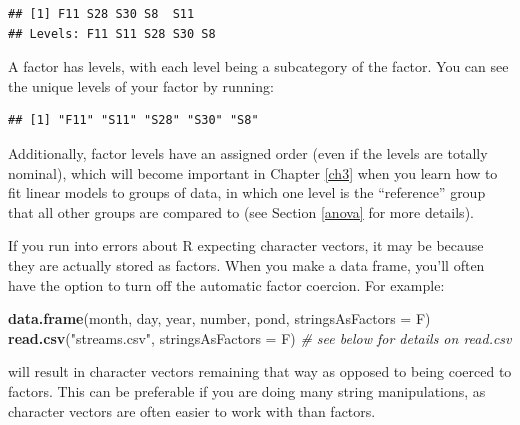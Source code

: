 \documentclass[]{book}
\newenvironment{Shaded}{\begin{snugshade}}{\end{snugshade}}
\newcommand{\KeywordTok}[1]{\textcolor[rgb]{0.13,0.29,0.53}{\textbf{#1}}}
\newcommand{\DataTypeTok}[1]{\textcolor[rgb]{0.13,0.29,0.53}{#1}}
\newcommand{\StringTok}[1]{\textcolor[rgb]{0.31,0.60,0.02}{#1}}
\newcommand{\CommentTok}[1]{\textcolor[rgb]{0.56,0.35,0.01}{\textit{#1}}}
\newcommand{\OperatorTok}[1]{\textcolor[rgb]{0.81,0.36,0.00}{\textbf{#1}}}
\newcommand{\NormalTok}[1]{#1}
\theoremstyle{definition}
\theoremstyle{definition}
\theoremstyle{definition}
\theoremstyle{remark}
\begin{document}
\begin{Shaded}
\end{Shaded}

\begin{verbatim}
## [1] F11 S28 S30 S8  S11
## Levels: F11 S11 S28 S30 S8
\end{verbatim}

A factor has levels, with each level being a subcategory of the factor.
You can see the unique levels of your factor by running:

\begin{Shaded}
\end{Shaded}

\begin{verbatim}
## [1] "F11" "S11" "S28" "S30" "S8"
\end{verbatim}

Additionally, factor levels have an assigned order (even if the levels
are totally nominal), which will become important in Chapter \ref{ch3}
when you learn how to fit linear models to groups of data, in which one
level is the ``reference'' group that all other groups are compared to
(see Section \ref{anova} for more details).

If you run into errors about R expecting character vectors, it may be
because they are actually stored as factors. When you make a data frame,
you'll often have the option to turn off the automatic factor coercion.
For example:

\begin{Shaded}
\begin{Highlighting}[]
\KeywordTok{data.frame}\NormalTok{(month, day, year, number, pond, }\DataTypeTok{stringsAsFactors =}\NormalTok{ F)}
\KeywordTok{read.csv}\NormalTok{(}\StringTok{"streams.csv"}\NormalTok{, }\DataTypeTok{stringsAsFactors =}\NormalTok{ F)  }\CommentTok{# see below for details on read.csv}
\end{Highlighting}
\end{Shaded}

will result in character vectors remaining that way as opposed to being
coerced to factors. This can be preferable if you are doing many string
manipulations, as character vectors are often easier to work with than
factors.
\end{document}
